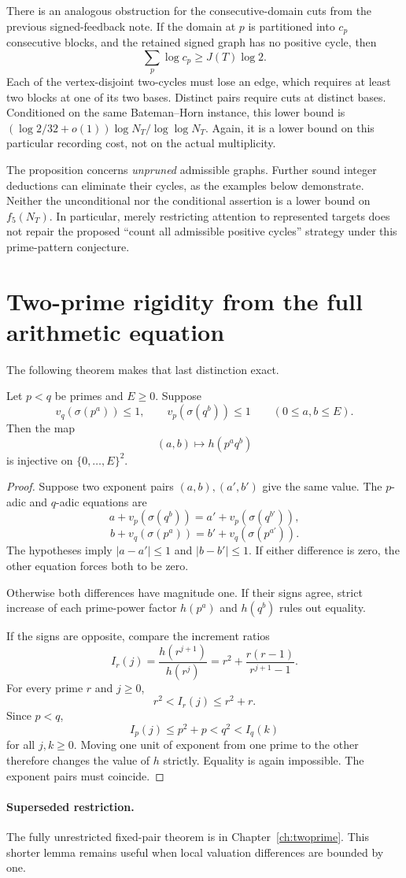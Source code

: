 There is an analogous obstruction for the consecutive-domain cuts from the previous signed-feedback note. If the domain at $p$ is partitioned into $c_p$ consecutive blocks, and the retained signed graph has no positive cycle, then
\[
 \sum_p\log c_p\ge J(T)\log2.
\]
Each of the vertex-disjoint two-cycles must lose an edge, which requires at least two blocks at one of its two bases. Distinct pairs require cuts at distinct bases. Conditioned on the same Bateman--Horn instance, this lower bound is $(\log2/32+o(1))\log N_T/\log\log N_T$. Again, it is a lower bound on this particular recording cost, not on the actual multiplicity.

The proposition concerns \emph{unpruned} admissible graphs. Further sound integer deductions can eliminate their cycles, as the examples below demonstrate. Neither the unconditional nor the conditional assertion is a lower bound on $f_5(N_T)$. In particular, merely restricting attention to represented targets does not repair the proposed ``count all admissible positive cycles'' strategy under this prime-pattern conjecture.


\section{Two-prime rigidity from the full arithmetic equation}
The following theorem makes that last distinction exact.

\begin{theorem}\label{bhunit:thm:rigidity}
Let $p<q$ be primes and $E\ge0$. Suppose
\[
 v_q(\sigma(p^a))\le1,\qquad v_p(\sigma(q^b))\le1
 \qquad(0\le a,b\le E).
\]
Then the map
\[
 (a,b)\longmapsto h(p^a q^b)
\]
is injective on $\{0,\ldots,E\}^2$.
\end{theorem}
\begin{proof}
Suppose two exponent pairs $(a,b),(a',b')$ give the same value. The $p$-adic and $q$-adic equations are
\[
 a+v_p(\sigma(q^b))=a'+v_p(\sigma(q^{b'})),
\]
\[
 b+v_q(\sigma(p^a))=b'+v_q(\sigma(p^{a'})).
\]
The hypotheses imply $|a-a'|\le1$ and $|b-b'|\le1$. If either difference is zero, the other equation forces both to be zero.

Otherwise both differences have magnitude one. If their signs agree, strict increase of each prime-power factor $h(p^a)$ and $h(q^b)$ rules out equality.

If the signs are opposite, compare the increment ratios
\[
 I_r(j)=\frac{h(r^{j+1})}{h(r^j)}
 =r^2+\frac{r(r-1)}{r^{j+1}-1}.
\]
For every prime $r$ and $j\ge0$,
\[
 r^2<I_r(j)\le r^2+r.
\]
Since $p<q$,
\[
 I_p(j)\le p^2+p<q^2<I_q(k)
\]
for all $j,k\ge0$. Moving one unit of exponent from one prime to the other therefore changes the value of $h$ strictly. Equality is again impossible. The exponent pairs must coincide.
\end{proof}


\paragraph{Superseded restriction.} The fully unrestricted fixed-pair theorem is in Chapter~\ref{ch:twoprime}. This shorter lemma remains useful when local valuation differences are bounded by one.
